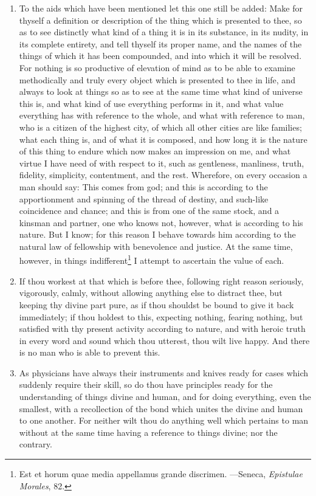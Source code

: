 \begin{enumerate}
\item To the aids which have been mentioned let this one still be added: Make for thyself a definition or description of the thing which is presented to thee, so as to see distinctly what kind of a thing it is in its substance, in its nudity, in its complete entirety, and tell thyself its proper name, and the names of the things of which it has been compounded, and into which it will be resolved. For nothing is so productive of elevation of mind as to be able to examine methodically and truly every object which is presented to thee in life, and always to look at things so as to see at the same time what kind of universe this is, and what kind of use everything performs in it, and what value everything has with reference to the whole, and what with reference to man, who is a citizen of the highest city, of which all other cities are like families; what each thing is, and of what it is composed, and how long it is the nature of this thing to endure which now makes an impression on me, and what virtue I have need of with respect to it, such as gentleness, manliness, truth, fidelity, simplicity, contentment, and the rest. Wherefore, on every occasion a man should say: This comes from god; and this is according to the apportionment and spinning of the thread of destiny, and such-like coincidence and chance; and this is from one of the same stock, and a kinsman and partner, one who knows not, however, what is according to his nature. But I know; for this reason I behave towards him according to the natural law of fellowship with benevolence and justice. At the same time, however, in things indifferent\footnote{Est et horum quae media appellamus grande discrimen. —Seneca, \textit{Epistulae Morales}, 82.} I attempt to ascertain the value of each.

\item If thou workest at that which is before thee, following right reason seriously, vigorously, calmly, without allowing anything else to distract thee, but keeping thy divine part pure, as if thou shouldst be bound to give it back immediately; if thou holdest to this, expecting nothing, fearing nothing, but satisfied with thy present activity according to nature, and with heroic truth in every word and sound which thou utterest, thou wilt live happy. And there is no man who is able to prevent this.

\item As physicians have always their instruments and knives ready for cases which suddenly require their skill, so do thou have principles ready for the understanding of things divine and human, and for doing everything, even the smallest, with a recollection of the bond which unites the divine and human to one another. For neither wilt thou do anything well which pertains to man without at the same time having a reference to things divine; nor the contrary.


\end{enumerate}
